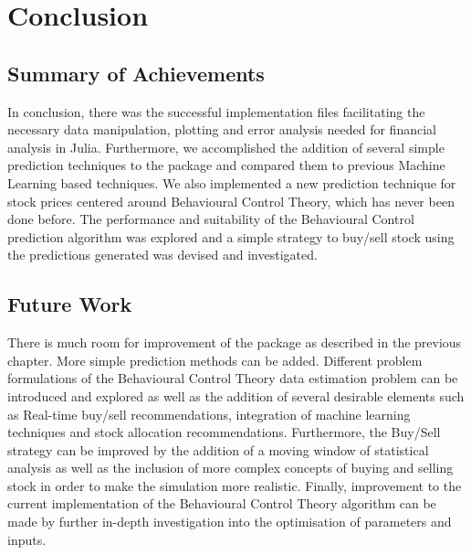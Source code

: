 \chapter{Conclusion}
\label{chapter: Conclusion}
\section{Summary of Achievements}
In conclusion, there was the successful implementation files facilitating the necessary data manipulation, plotting and error analysis needed for financial analysis in Julia. Furthermore, we accomplished the addition of several simple prediction techniques to the package and compared them to previous Machine Learning based techniques. We also implemented a new prediction technique for stock prices centered around Behavioural Control Theory, which has never been done before. The performance and suitability of the Behavioural Control prediction algorithm was explored and a simple strategy to buy/sell stock using the predictions generated was devised and investigated.

\section{Future Work}
There is much room for improvement of the package as described in the previous chapter. More simple prediction methods can be added. Different problem formulations of the Behavioural Control Theory data estimation problem can be introduced and explored as well as the addition of several desirable elements such as Real-time buy/sell recommendations, integration of machine learning techniques and stock allocation recommendations. Furthermore, the Buy/Sell strategy can be improved by the addition of a moving window of statistical analysis as well as the inclusion of more complex concepts of buying and selling stock in order to make the simulation more realistic. Finally, improvement to the current implementation of the Behavioural Control Theory algorithm can be made by further in-depth investigation into the optimisation of parameters and inputs. 

